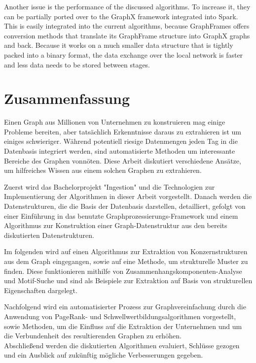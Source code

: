 \documentclass[
        a4paper,     %
        titlepage,   %
        oneside,     %
        parskip      %
]{scrartcl}          %
\begin{document}
  Another issue is the performance of the discussed algorithms. To increase it,
  they can be partially ported over to the GraphX framework integrated into Spark.
  This is easily integrated into the current algorithms, because
  GraphFrames offers conversion methods that translate its GraphFrame structure
  into GraphX graphs and back. Because it works on a much smaller data structure
  that is tightly packed into a binary format, the data exchange over the
  local network is faster and less data needs to be stored between stages.

  \clearpage

  
  \clearpage

  \pagestyle{plain}

  \section*{Zusammenfassung}
  { \large
    Einen Graph aus Millionen von Unternehmen zu konstruieren mag einige Probleme
    bereiten, aber tats\"achlich Erkenntnisse daraus zu extrahieren ist um einiges schwieriger.
    W\"ahrend potentiell riesige Datenmengen jeden Tag in die Datenbasis integriert werden,
    sind automatisierte Methoden um interessante Bereiche des Graphen vonn\"oten.
    Diese Arbeit diskutiert verschiedene Ans\"atze, um hilfreiches Wissen aus einem solchen Graphen zu extrahieren.

    Zuerst wird das Bachelorprojekt "Ingestion" und die Technologien zur Implementierung
    der Algorithmen in dieser Arbeit vorgestellt. Danach werden die Datenstrukturen, die die Basis der
    Datenbasis darstellen, detailliert, gefolgt von einer Einf\"uhrung in das benutzte
    Graphprozessierungs-Framework und einem Algorithmus zur Konstruktion einer Graph-Datenstruktur
    aus den bereits diskutierten Datenstrukturen.

    Im folgenden wird auf einen Algorithmus zur Extraktion von Konzernstrukturen aus dem Graph eingegangen,
    sowie auf eine Methode, um strukturelle Muster zu finden. Diese funktionieren
    mithilfe von Zusammenhangskomponenten-Analyse und Motif-Suche und sind als
    Beispiele zur Extraktion auf Basis von strukturellen Eigenschaften dargelegt.

    Nachfolgend wird ein automatisierter Prozess zur Graphvereinfachung durch die
    Anwendung von PageRank- und Schwellwertbildungsalgorithmen vorgestellt, sowie
    Methoden, um die Einfluss auf die Extraktion der Unternehmen und um die Verbundenheit
    des resultierenden Graphen zu erh\"ohen.\\
    Abschlie{\ss}end werden die diskutierten Algorithmen evaluiert, Schl\"usse gezogen
    und ein Ausblick auf zuk\"unftig m\"ogliche Verbesserungen gegeben.
  }
  \clearpage
\end{document}
